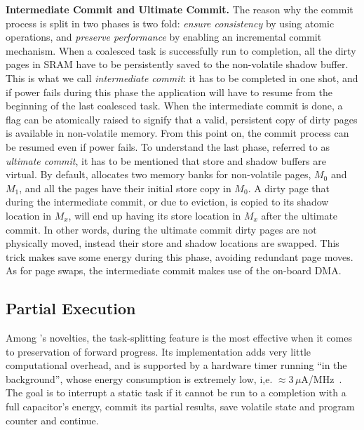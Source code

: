 \textbf{Intermediate Commit and Ultimate Commit.} The reason why the commit process is split in two phases is two fold: \emph{ensure consistency} by using atomic operations, and \emph{preserve performance} by enabling an incremental commit mechanism. When a coalesced task is successfully run to completion, all the dirty pages in SRAM have to be persistently saved to the non-volatile shadow buffer. This is what we call \emph{intermediate commit}: it has to be completed in one shot, and if power fails during this phase the application will have to resume from the beginning of the last coalesced task. When the intermediate commit is done, a flag can be atomically raised to signify that a valid, persistent copy of dirty pages is available in non-volatile memory. From this point on, the commit process can be resumed even if power fails.
To understand the last phase, referred to as \emph{ultimate commit}, it has to be mentioned that store and shadow buffers are virtual. By default, \sys allocates two memory banks for non-volatile pages, $M_0$ and $M_1$, and all the pages have their initial store copy in $M_0$. A dirty page that during the intermediate commit, or due to eviction, is copied to its shadow location in $M_x$, will end up having its store location in $M_x$ after the ultimate commit. In other words, during the ultimate commit dirty pages are not physically moved, instead their store and shadow locations are swapped. This trick makes \sys save some energy during this phase, avoiding redundant page moves. As for page swaps, the intermediate commit makes use of the on-board DMA.

\subsection{Partial Execution}

Among \sys's novelties, the task-splitting feature is the most effective when it comes to preservation of forward progress. Its implementation adds very little computational overhead, and is supported by a hardware timer running ``in the background'', whose energy consumption is extremely low, i,e. $\approx$3\,$\mu$A/MHz~\cite{msp430datasheet}. The goal is to interrupt a static task if it cannot be run to a completion with a full capacitor's energy, commit its partial results, save volatile state and program counter and continue. 

